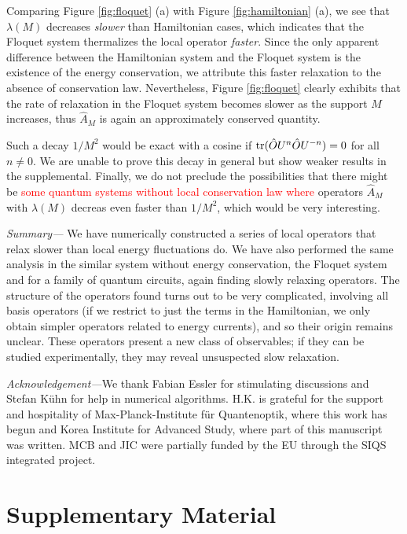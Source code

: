 \documentclass[twocolumn,superscriptaddress, prl,showpacs]{revtex4-1}
\newcommand{\addr}[1]{\textcolor{red}{#1}}
\begin{document}
Comparing Figure \ref{fig:floquet} (a) with Figure \ref{fig:hamiltonian} (a),
we see that $\lambda(M)$ decreases {\it slower} than Hamiltonian cases, which indicates that the Floquet system thermalizes
the local operator {\it faster}. Since the only apparent difference between the Hamiltonian system and the Floquet system
is the existence of the energy conservation, we attribute this faster relaxation to the absence of conservation law.
Nevertheless, Figure \ref{fig:floquet} clearly exhibits that the rate of relaxation in the Floquet system
becomes slower as the support $M$ increases, thus $\hat{A}_M$ is again an approximately conserved quantity.

Such a decay $1/M^2$ would be exact with a cosine if
${\rm tr}(\hat{O} U^n \hat{O} U^{- n})=0$ for all $n \neq 0$.
We are unable to prove this decay in general but show weaker results in the supplemental.
Finally, we do not preclude the possibilities that
there might be \addr{some quantum systems without local conservation law where} 
operators $\hat{A}_M$ with $\lambda(M)$ decreas even faster than $1/M^2$,
which would be very interesting.


{\it Summary---}
We have numerically constructed a series of local operators that relax slower than local energy fluctuations do.
We have also performed the same analysis in the similar system without energy conservation,
the Floquet system and for a family of quantum circuits, again finding slowly relaxing operators.
The structure of the operators found turns out to be very complicated, involving all basis operators
(if we restrict to just the terms in the Hamiltonian, we only obtain simpler operators related to energy currents),
and so their origin remains unclear.
These operators present a new class of observables; if they can be studied experimentally, they may reveal unsuspected slow relaxation.

{\it Acknowledgement---}We thank Fabian Essler for stimulating discussions and Stefan K\"{u}hn for help in numerical algorithms.
H.K. is grateful for the support and hospitality of Max-Planck-Institute f\"{u}r Quantenoptik,
where this work has begun and Korea Institute for Advanced Study, where part of this manuscript was written.
MCB and JIC were partially funded by the EU through the SIQS integrated project.




\newpage
\section*{Supplementary Material}
\end{document}
